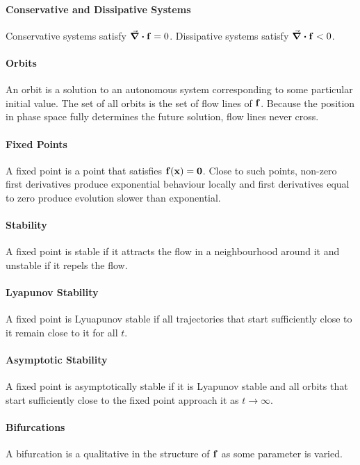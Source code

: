 \paragraph{Conservative and Dissipative Systems}
Conservative systems satisfy $\div{\vb{f}} = 0$. Dissipative systems satisfy $\div{\vb{f}} < 0$.

\paragraph{Orbits}
An orbit is a solution to an autonomous system corresponding to some particular initial value. The set of all orbits is the set of flow lines of $\vb{f}$. Because the position in phase space fully determines the future solution, flow lines never cross.

\paragraph{Fixed Points}
A fixed point is a point that satisfies $\vb{f}(\vb{x}) = \vb{0}$. Close to such points, non-zero first derivatives produce exponential behaviour locally and first derivatives equal to zero produce evolution slower than exponential.

\paragraph{Stability}
A fixed point is stable if it attracts the flow in a neighbourhood around it and unstable if it repels the flow.

\paragraph{Lyapunov Stability}
A fixed point is Lyuapunov stable if all trajectories that start sufficiently close to it remain close to it for all $t$.

\paragraph{Asymptotic Stability}
A fixed point is asymptotically stable if it is Lyapunov stable and all orbits that start sufficiently close to the fixed point approach it as $t\to\infty$.

\paragraph{Bifurcations}
A bifurcation is a qualitative in the structure of $\vb{f}$ as some parameter is varied.

